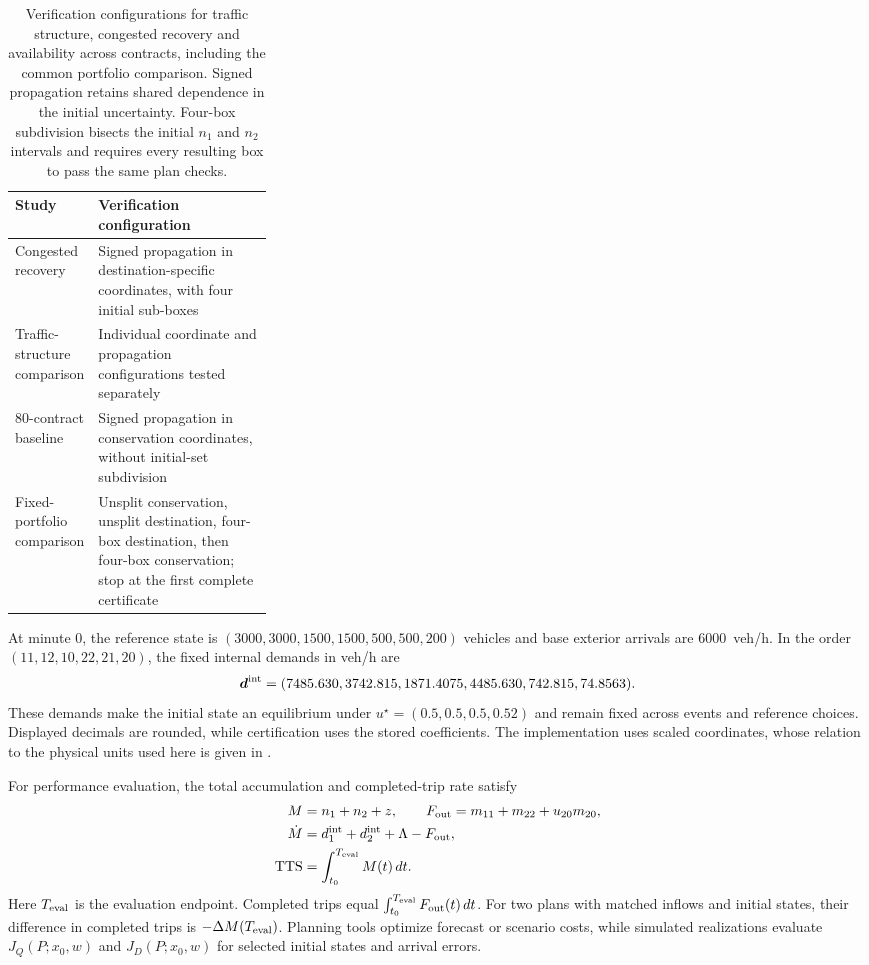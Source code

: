 \begin{table}[!htbp]
\centering\small
\caption{Verification configurations for traffic structure, congested recovery
and availability across contracts, including the common portfolio comparison.
Signed propagation retains shared dependence in the initial uncertainty.
Four-box subdivision bisects the initial $n_1$ and $n_2$ intervals and
requires every resulting box to pass the same plan checks.}
\label{tab:verification-configurations}
\begin{tabularx}{\linewidth}{@{}p{0.30\linewidth}X@{}}
\toprule
Study & Verification configuration\\
\midrule
Congested recovery & Signed propagation in destination-specific coordinates,
with four initial sub-boxes\\
Traffic-structure comparison & Individual coordinate and propagation
configurations tested separately\\
80-contract baseline & Signed propagation in conservation coordinates,
without initial-set subdivision\\
Fixed-portfolio comparison & Unsplit conservation, unsplit destination,
four-box destination, then four-box conservation; stop at the first
complete certificate\\
\bottomrule
\end{tabularx}
\end{table}


At minute 0, the reference state is
$(3000,3000,1500,1500,500,500,200)$ vehicles and base exterior arrivals
are 6000~veh/h. In the order $(11,12,10,22,21,20)$, the fixed internal
demands in veh/h are
\begin{equation}
\boldsymbol d^{\rm int}=(7485.630,3742.815,1871.4075,
                        4485.630,742.815,74.8563).
\label{eq:new-incident-demands}
\end{equation}
These demands make the initial state an equilibrium under
$u^\star=(0.5,0.5,0.5,0.52)$ and remain fixed across events and reference
choices. Displayed decimals are rounded, while certification uses the
stored coefficients. The implementation uses scaled
coordinates, whose relation to the physical units used here is given in
.

For performance evaluation, the total accumulation and completed-trip
rate satisfy
\begin{equation}
\begin{aligned}
M&=n_1+n_2+z,\qquad F_{\rm out}=m_{11}+m_{22}+u_{20}m_{20},\\
\dot M&=d_1^{\rm int}+d_2^{\rm int}+\Lambda-F_{\rm out},\\
\mathrm{TTS}&=\int_{t_0}^{T_{\rm eval}}M(t)\,dt.
\end{aligned}
\label{eq:new-conservation}
\end{equation}
Here $T_{\rm eval}$ is the evaluation endpoint. Completed trips equal
$\int_{t_0}^{T_{\rm eval}}F_{\rm out}(t)\,dt$. For two plans with matched
inflows and initial states, their difference in completed trips is
$-\Delta M(T_{\rm eval})$. Planning tools optimize forecast or scenario
costs, while simulated realizations evaluate $J_Q(P;x_0,w)$ and
$J_D(P;x_0,w)$ for selected initial states and arrival errors.

